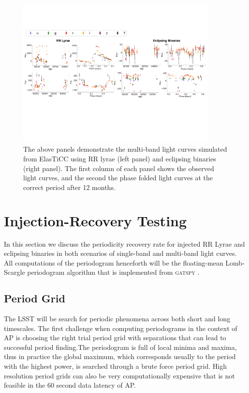\documentclass[DM,authoryear,toc]{lsstdoc}
\begin{document}
\begin{figure}
  \includegraphics[width=0.9\textwidth]{figures/lightcurve_demo.pdf}
  \centering 
  \caption{The above panels demonstrate the multi-band light curves simulated from ElasTiCC using RR lyrae (left panel) and eclipsing binaries (right panel).
The first column of each panel shows the observed light curves, and the second the phase folded light curves at the correct period after 12 months.}
   \label{fig:light_curve_demo}
\end{figure}

\section{Injection-Recovery Testing}
In this section we discuss the periodicity recovery rate for injected RR Lyrae and eclipsing binaries in both scenarios of single-band and multi-band light curves. All computations of the periodogram henceforth will be the floating-mean Lomb-Scargle periodogram algorithm that is implemented from \textsc{gatspy} \citet{VanderPlas:VP2015}.


\subsection{Period Grid}
The LSST will be search for periodic phenomena across both short and long timescales.
The first challenge when computing periodograms in the context of AP is choosing the right trial period grid with separations that can lead to successful period finding.The periodogram is full of local minima and maxima, thus in practice the global maximum, which corresponds usually to the period with the highest power, is searched through a brute force period grid. High resolution period grids can also be very computationally expensive that is not feasible in the 60 second data latency of AP.
\end{document}
